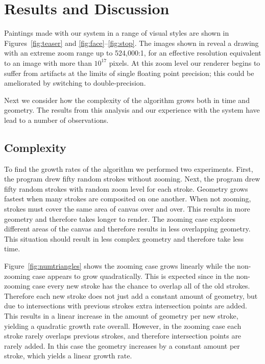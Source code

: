 \documentclass[conference]{acmsiggraph}
\begin{document}
\section{Results and Discussion}
Paintings made with our system in a range of visual styles are shown in Figures~\ref{fig:teaser} and \ref{fig:face}--\ref{fig:stop}.  
%
The images shown in 
reveal a drawing with an extreme zoom range up to 524,000:1, 
for an effective resolution equivalent to an image with more than $10^{17}$ pixels.
At this zoom level our renderer begins to suffer from artifacts at 
the limits of single floating point precision; 
this could be ameliorated by switching to double-precision. 

Next we  consider how the complexity of the algorithm grows both in time and geometry.
The results from this analysis and our experience with the system have lead to a number of observations.

\subsection{Complexity}
To find the growth rates of the algorithm we performed two experiments. 
First, the program drew fifty random strokes without zooming.
Next, the program drew fifty random strokes with random zoom level for each stroke.
Geometry grows fastest when many strokes are composited on one another. When not zooming, strokes
must cover the same area of canvas over and over. This
results in more geometry and therefore takes longer to render. The zooming case explores different
areas of the canvas and therefore results in less overlapping geometry. This situation should result
in less complex geometry and therefore take less time.

Figure~\ref{fig:numtriangles} shows the zooming case grows linearly while the non-zooming case
appears to grow quadratically. This is expected since in the non-zooming case every new stroke has the chance to overlap
all of the old strokes. Therefore each new stroke does not just add a constant amount of geometry, but 
due to intersections with previous strokes extra intersection points are added. This results in a linear
increase in the amount of geometry per new stroke, yielding a quadratic growth rate overall. 
However, in the zooming case each stroke rarely overlaps previous strokes, and therefore
intersection points are rarely added. In this case the geometry increases by a constant amount per stroke, which yields a linear growth rate.
\end{document}
